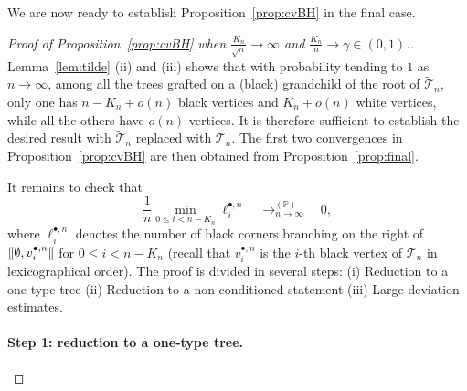 \documentclass[AHL,XML,longabstracts,Unicode]{cedram}
\renewcommand{\P}{\mathbb{P}}
\def\tTs{\tilde{\Ts}}
\def\Ts{\mathscr{T}}
\def\llbracket{[\hspace{-.10em} [ }
\begin{document}
We are now ready to establish Proposition~\ref{prop:cvBH} in the final case.

\begin{proof}[Proof of  Proposition~\ref{prop:cvBH}  when $\tfrac{K_{n}}{\sqrt{n}} \rightarrow \infty$ and $ \tfrac{K_{n}}{n}  \rightarrow \gamma \in (0,1)$.]
Lemma~\ref{lem:tilde} (ii) and (iii) shows that with probability tending to $1$ as $n \rightarrow \infty$, among all the trees grafted on a (black) grandchild of the root of $\tTs_{n}$, only one has $n-K_{n}+o(n)$ black vertices and $K_{n}+o(n)$ white vertices, while all the others have $o(n)$ vertices. It is therefore sufficient to establish the desired result with $\tTs_{n}$ replaced with $\Ts_{n}$.  The first two convergences in  Proposition~\ref{prop:cvBH}  are then obtained from Proposition~\ref{prop:final}.

It remains to check that
\[ \frac{1}{n} \min_{0 \leq i < n-K_{n}} \ell^{\bullet,n}_{i}  \quad \mathop{\longrightarrow}^{(\P)}_{n \rightarrow \infty} \quad 0,\]
where $\ell^{\bullet,n}_{i}$ denotes  the number of black corners  branching on the right of  $\llbracket \emptyset, v^{\bullet,n}_{i} \llbracket$ for $0 \leq i < n-K_{n}$ (recall that $v^{\bullet,n}_{i} $ is the $i$-th black vertex of $\Ts_{n}$ in lexicographical order).
The proof is divided in several steps: (i) Reduction to a one-type tree (ii) Reduction to a non-conditioned statement (iii) Large deviation estimates.

\paragraph*{Step 1: reduction to a one-type tree.}

\begin{figure}[t] \centering
\begin{scriptsize}
\end{scriptsize}
\end{figure}
\end{proof}
\end{document}

